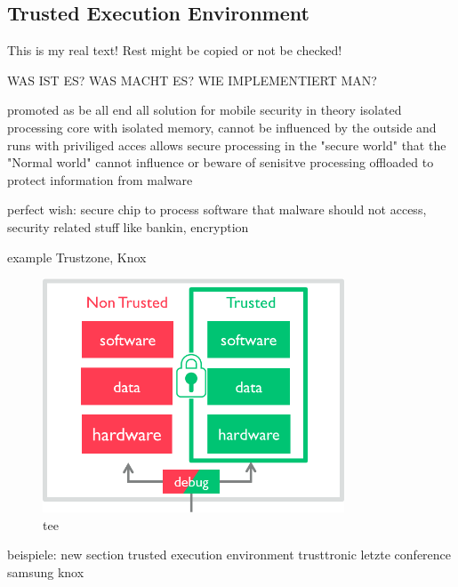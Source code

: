 \subsection{Trusted Execution Environment}\label{subsection:counter-external-tee}
This is my real text! Rest might be copied or not be checked!

WAS IST ES?
WAS MACHT ES?
WIE IMPLEMENTIERT MAN?

%
promoted as be all end all solution for mobile security
in theory isolated processing core with isolated memory, cannot be influenced by the outside and runs with priviliged acces
allows secure processing in the "secure world" that the "Normal world" cannot influence or beware of
senisitve processing offloaded to protect information from malware

perfect wish:
secure chip to process software that malware should not access, security related stuff like bankin, encryption

example Trustzone, Knox
\begin{figure}[h]
    \centering
    \includegraphics[width=0.8\textwidth]{data/tee.png}
    \caption{tee \cite{armTz}}
    \label{fig:tee}
\end{figure}


\cite{dragonTZ}\cite{armTz}
%



beispiele:
new section trusted execution environment
trusttronic letzte conference
samsung knox

